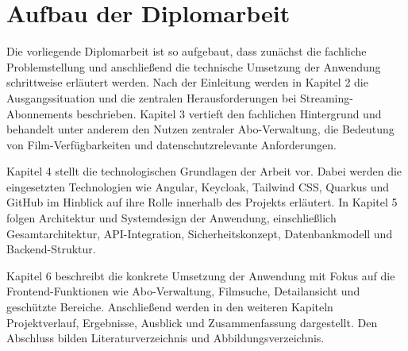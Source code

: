 \section{Aufbau der Diplomarbeit}
Die vorliegende Diplomarbeit ist so aufgebaut, dass zunächst die fachliche Problemstellung und anschließend die technische Umsetzung der Anwendung schrittweise erläutert werden. Nach der Einleitung werden in Kapitel 2 die Ausgangssituation und die zentralen Herausforderungen bei Streaming-Abonnements beschrieben. Kapitel 3 vertieft den fachlichen Hintergrund und behandelt unter anderem den Nutzen zentraler Abo-Verwaltung, die Bedeutung von Film-Verfügbarkeiten und datenschutzrelevante Anforderungen.

Kapitel 4 stellt die technologischen Grundlagen der Arbeit vor. Dabei werden die eingesetzten Technologien wie Angular, Keycloak, Tailwind CSS, Quarkus und GitHub im Hinblick auf ihre Rolle innerhalb des Projekts erläutert. In Kapitel 5 folgen Architektur und Systemdesign der Anwendung, einschließlich Gesamtarchitektur, API-Integration, Sicherheitskonzept, Datenbankmodell und Backend-Struktur.

Kapitel 6 beschreibt die konkrete Umsetzung der Anwendung mit Fokus auf die Frontend-Funktionen wie Abo-Verwaltung, Filmsuche, Detailansicht und geschützte Bereiche. Anschließend werden in den weiteren Kapiteln Projektverlauf, Ergebnisse, Ausblick und Zusammenfassung dargestellt. Den Abschluss bilden Literaturverzeichnis und Abbildungsverzeichnis.
